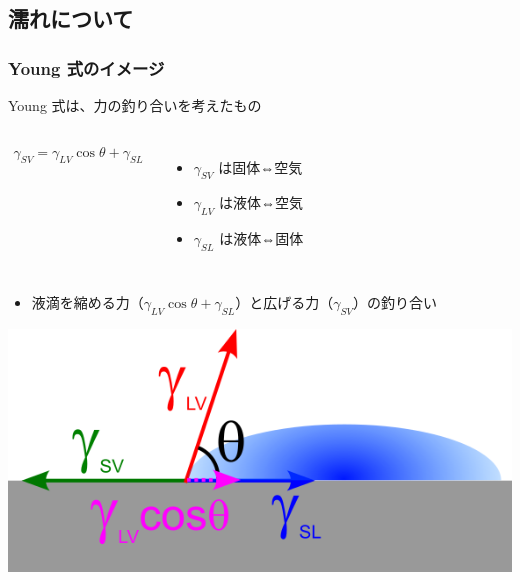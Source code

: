 \documentclass[unicode,12pt]{beamer}%
\begin{document}
\subsection{濡れについて}
\begin{frame}
	\frametitle{Young 式のイメージ}
	\begin{block}{Young 式は、力の釣り合いを考えたもの}
		\begin{columns}[c, onlytextwidth]
			\begin{align*}
				\gamma_{SV} = \gamma_{LV} \cos \theta + \gamma_{SL}
			\end{align*}
			\begin{itemize}
				\item $\gamma_{SV}$ は固体⇔空気
				\item $\gamma_{LV}$ は液体⇔空気
				\item $\gamma_{SL}$ は液体⇔固体
			\end{itemize}
		\end{columns}
		
		\vspace{2mm}
		\begin{itemize}
			\item 液滴を縮める力（$\gamma_{LV} \cos \theta + \gamma_{SL}$）と広げる力（$\gamma_{SV}$）の釣り合い
		\end{itemize}

		\centering
			\includegraphics[width=.45\textwidth]{young.png}
	\end{block}
\end{frame}
\end{document}
